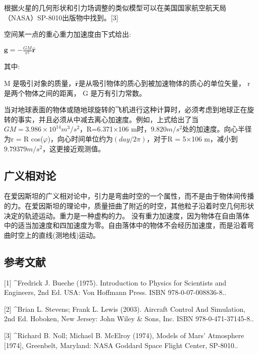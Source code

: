 根据火星的几何形状和引力场调整的类似模型可以在美国国家航空航天局（NASA）SP-8010出版物中找到。[3]

空间某一点的重心重力加速度由下式给出:

$\mathbf{g} = -\frac{GM}{r^2} \hat{\mathbf{r}}$

其中:

M 是吸引对象的质量，$\hat{\mathbf{r}}$是从吸引物体的质心到被加速物体的质心的单位矢量， r 是两个物体之间的距离， G 是万有引力常数。

当对地球表面的物体或随地球旋转的飞机进行这种计算时，必须考虑到地球正在旋转的事实，并且必须从中减去离心加速度。例如，上式给出了当$GM = 3.986\times10^{14} m^3/s^2$，R=6.371×106 m时，$9.820 m/s^2$处的加速度。向心半径为r = R cos($\varphi$)，向心时间单位约为$(day / 2\pi)$，对于R = 5×106 m，减小到$9.79379 m/s^2$，这更接近观测值。

\subsection{广义相对论}

在爱因斯坦的广义相对论中，引力是弯曲时空的一个属性，而不是由于物体间传播的力。在爱因斯坦的理论中，质量扭曲了附近的时空，其他粒子沿着时空几何形状决定的轨迹运动。重力是一种虚构的力。 没有重力加速度，因为物体在自由落体中的适当加速度和四加速度为零。自由落体中的物体不会经历加速度，而是沿着弯曲时空上的直线(测地线)运动。

\subsection{参考文献}

[1]
^Fredrick J. Bueche (1975). Introduction to Physics for Scientists and Engineers, 2nd Ed. USA: Von Hoffmann Press. ISBN 978-0-07-008836-8..

[2]
^Brian L. Stevens; Frank L. Lewis (2003). Aircraft Control And Simulation, 2nd Ed. Hoboken, New Jersey: John Wiley & Sons, Inc. ISBN 978-0-471-37145-8..

[3]
^Richard B. Noll; Michael B. McElroy (1974), Models of Mars' Atmosphere [1974], Greenbelt, Maryland: NASA Goddard Space Flight Center, SP-8010..